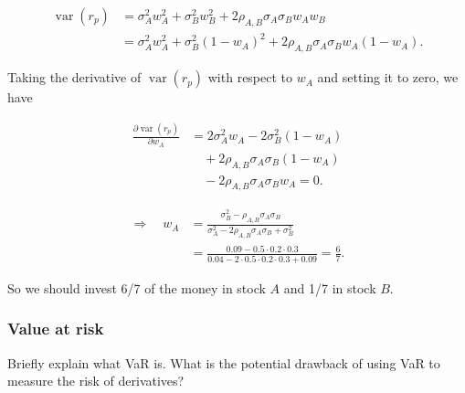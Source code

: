 \begin{solution}
\[
\begin{aligned}
\operatorname{var}(r_p)&=\sigma_A^2w_A^2+\sigma_B^2w_B^2
+2\rho_{A,B}\sigma_A\sigma_Bw_Aw_B\\
&=\sigma_A^2w_A^2+\sigma_B^2(1-w_A)^2
+2\rho_{A,B}\sigma_A\sigma_Bw_A(1-w_A).
\end{aligned}
\]

Taking the derivative of $\operatorname{var}(r_p)$ with respect to $w_A$ and setting it
to zero, we have

\[
\begin{aligned}
\frac{\partial\operatorname{var}(r_p)}{\partial w_A}
&=2\sigma_A^2w_A-2\sigma_B^2(1-w_A)\\
&\quad+2\rho_{A,B}\sigma_A\sigma_B(1-w_A)\\
&\quad-2\rho_{A,B}\sigma_A\sigma_Bw_A=0.
\end{aligned}
\]

\[
\begin{aligned}
\Rightarrow\quad
w_A&=\frac{\sigma_B^2-\rho_{A,B}\sigma_A\sigma_B}
{\sigma_A^2-2\rho_{A,B}\sigma_A\sigma_B+\sigma_B^2}\\
&=\frac{0.09-0.5\cdot0.2\cdot0.3}
{0.04-2\cdot0.5\cdot0.2\cdot0.3+0.09}=\frac{6}{7}.
\end{aligned}
\]

So we should invest 6/7 of the money in stock $A$ and 1/7 in stock $B$.\qedhere

\end{solution}

\subsubsection*{Value at risk}

\begin{problem}{Briefly explain what VaR is. What is the potential drawback of using VaR to measure the
risk of derivatives?}
\end{problem}

